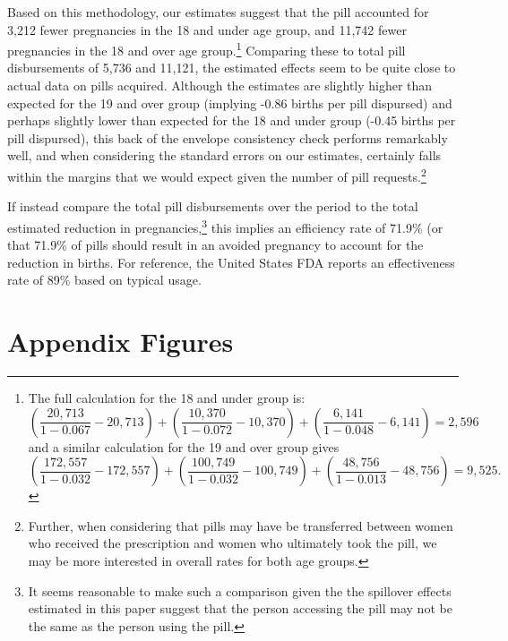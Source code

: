 \begin{spacing}{1.4}
Based on this methodology, our estimates suggest that the pill accounted for 
3,212 fewer pregnancies in the 18 and under age group, and 11,742 fewer 
pregnancies in the 18 and over age group.\footnote{The full calculation for the 
18 and under group is:
\begin{equation}
\nonumber
\left(\frac{20,713}{1-0.067}-20,713\right)+
\left(\frac{10,370}{1-0.072}-10,370\right)+
\left(\frac{6,141}{1-0.048}-6,141\right)=2,596
\end{equation}
and a similar calculation for the 19 and over group gives 
\begin{equation}
\nonumber
\left(\frac{172,557}{1-0.032}-172,557\right)+
\left(\frac{100,749}{1-0.032}-100,749\right)+
\left(\frac{48,756}{1-0.013}-48,756\right)=9,525.
\end{equation}
}
Comparing these to total pill disbursements of 5,736 and 11,121, the estimated
effects seem to be quite close to actual data on pills acquired.  Although the
estimates are slightly higher than expected for the 19 and over group (implying
-0.86 births per pill dispursed) and perhaps slightly lower than expected for the
18 and under group (-0.45 births per pill dispursed), this back of the envelope 
consistency check performs remarkably well, and when considering the standard 
errors on our estimates, certainly falls within the margins that we would expect
given the number of pill requests.\footnote{Further, when considering that
pills may have be transferred between women who received the prescription and
women who ultimately took the pill, we may be more interested in overall rates
for both age groups.}

If \person instead compare the total pill disbursements over the period to the 
total estimated reduction in pregnancies,\footnote{It seems reasonable to make 
such a comparison given the the spillover effects estimated in this paper suggest 
that the person accessing the pill may not be the same as the person using the 
pill.}  this implies an efficiency rate of 71.9\% (or that 71.9\% of pills should 
result in an avoided pregnancy to account for the reduction in births.  For 
reference, the United States FDA reports an effectiveness rate of 89\% based on
typical usage.

\newpage
\section{Appendix Figures}



\end{spacing}
